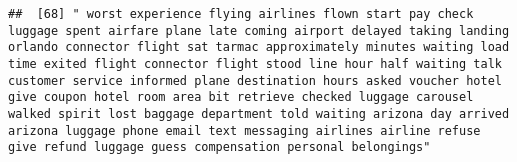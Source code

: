 \documentclass[
]{article}
\begin{document}
\begin{verbatim}
##  [68] " worst experience flying airlines flown start pay check luggage spent airfare plane late coming airport delayed taking landing orlando connector flight sat tarmac approximately minutes waiting load time exited flight connector flight stood line hour half waiting talk customer service informed plane destination hours asked voucher hotel give coupon hotel room area bit retrieve checked luggage carousel walked spirit lost baggage department told waiting arizona day arrived arizona luggage phone email text messaging airlines airline refuse give refund luggage guess compensation personal belongings"                                                                                                                                                                                                                                                                                                                                                                                                                                                                                                                                                                                                                                                                                                                                                                                                                                                                                                                                                                                                                                                                                                                                                                      

\end{verbatim}
\end{document}

